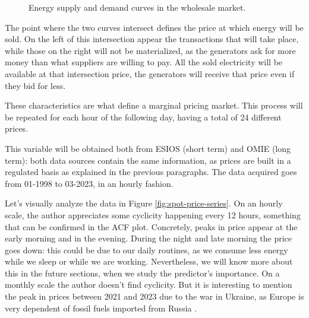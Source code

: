 \begin{figure}[H]
\centering
    \caption{Energy supply and demand curves in the wholesale market. \cite{curva-oferta-demanda}}
    \label{fig:supply-demand-curves}
\end{figure}

The point where the two curves intersect defines the price at which energy will be sold. On the left of this intersection appear the transactions that will take place, while those on the right will not be materialized, as the generators ask for more money than what suppliers are willing to pay.
All the sold electricity will be available at that intersection price, the generators will receive that price even if they bid for less.

These characteristics are what define a marginal pricing market.
This process will be repeated for each hour of the following day, having a total of 24 different prices.

This variable will be obtained both from ESIOS (short term) and OMIE (long term): both data sources contain the same information, as prices are built in a regulated basis as explained in the previous paragraphs. The data acquired goes from 01-1998 to 03-2023, in an hourly fashion.

Let's visually analyze the data in Figure \ref{fig:spot-price-series}. On an hourly scale, the author appreciates some cyclicity happening every 12 hours, something that can be confirmed in the ACF plot.
Concretely, peaks in price appear at the early morning and in the evening.
During the night and late morning the price goes down: this could be due to our daily routines, as we consume less energy while we sleep or while we are working.
Nevertheless, we will know more about this in the future sections, when we study the predictor's importance.
On a monthly scale the author doesn't find cyclicity. But it is interesting to mention the peak in prices between 2021 and 2023 due to the war in Ukraine, as Europe is very dependent of fossil fuels imported from Russia \cite{lopez2022geopolitica}.

